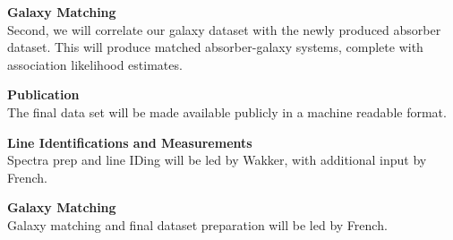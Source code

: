 \documentclass[12pt]{article}
\begin{document}
\noindent \textbf{Galaxy Matching}\\
\indent Second, we will correlate our galaxy dataset with the newly produced absorber dataset. This will produce matched absorber-galaxy systems, complete with association likelihood estimates.

\noindent \textbf{Publication}\\
\indent The final data set will be made available publicly in a machine readable format.



%
%
\budgetnarrative       %

\textbf{Line Identifications and Measurements}\\
\indent Spectra prep and line IDing will be led by Wakker, with additional input by French.

\noindent \textbf{Galaxy Matching}\\
\indent Galaxy matching and final dataset preparation will be led by French.
\end{document}
